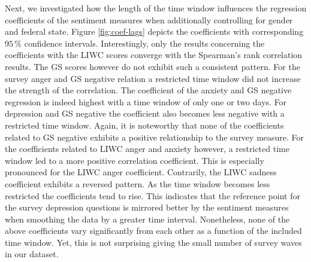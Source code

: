 \documentclass[
  english,
  jou,floatsintext]{apa7}
\begin{document}
Next, we investigated how the length of the time window influences the regression coefficients of the sentiment measures when additionally controlling for gender and federal state. Figure \ref{fig:coef-lags} depicts the coefficients with corresponding \(95\,\%\) confidence intervals. Interestingly, only the results concerning the coefficients with the LIWC scores converge with the Spearman's rank correlation results. The GS scores however do not exhibit such a consistent pattern. For the survey anger and GS negative relation a restricted time window did not increase the strength of the correlation. The coefficient of the anxiety and GS negative regression is indeed highest with a time window of only one or two days. For depression and GS negative the coefficient also becomes less negative with a restricted time window. Again, it is noteworthy that none of the coefficients related to GS negative exhibits a positive relationship to the survey measure. For the coefficients related to LIWC anger and anxiety however, a restricted time window led to a more positive correlation coefficient. This is especially pronounced for the LIWC anger coefficient. Contrarily, the LIWC sadness coefficient exhibits a reversed pattern. As the time window becomes less restricted the coefficients tend to rise. This indicates that the reference point for the survey depression questions is mirrored better by the sentiment measures when smoothing the data by a greater time interval. Nonetheless, none of the above coefficients vary significantly from each other as a function of the included time window. Yet, this is not surprising giving the small number of survey waves in our dataset.
\end{document}

